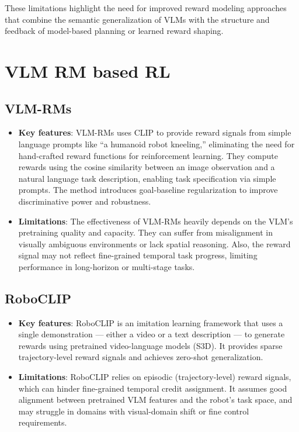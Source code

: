 \documentclass[11pt]{article}
\begin{document}
These limitations highlight the need for improved reward modeling approaches that combine the semantic generalization of VLMs with the structure and feedback of model-based planning or learned reward shaping.


\section{VLM RM based RL}

\subsection{VLM-RMs}
\begin{itemize}
    \item \textbf{Key features}: VLM-RMs \cite{vlmrm} uses CLIP to provide reward signals from simple language prompts like “a humanoid robot kneeling,” eliminating the need for hand-crafted reward functions for reinforcement learning. They compute rewards using the cosine similarity between an image observation and a natural language task description, enabling task specification via simple prompts. The method introduces goal-baseline regularization to improve discriminative power and robustness.

    \item \textbf{Limitations}: The effectiveness of VLM-RMs heavily depends on the VLM's pretraining quality and capacity. They can suffer from misalignment in visually ambiguous environments or lack spatial reasoning. Also, the reward signal may not reflect fine-grained temporal task progress, limiting performance in long-horizon or multi-stage tasks.
\end{itemize}

\subsection{RoboCLIP}
\begin{itemize}
    \item \textbf{Key features}: RoboCLIP \cite{roboclip} is an imitation learning framework that uses a single demonstration — either a video or a text description — to generate rewards using pretrained video-language models (S3D). It provides sparse trajectory-level reward signals and achieves zero-shot generalization.

    \item \textbf{Limitations}: RoboCLIP relies on episodic (trajectory-level) reward signals, which can hinder fine-grained temporal credit assignment. It assumes good alignment between pretrained VLM features and the robot’s task space, and may struggle in domains with visual-domain shift or fine control requirements.
\end{itemize}
\end{document}
